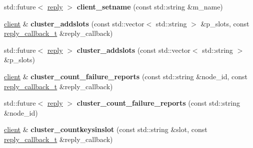 \begin{DoxyCompactItemize}
\item 
\mbox{\label{classcpp__redis_1_1client_aa1ab41fda6b2536f652720b7720a0b63}} 
std\+::future$<$ \mbox{\hyperlink{classcpp__redis_1_1reply}{reply}} $>$ {\bfseries client\+\_\+setname} (const std\+::string \&m_name)
\item 
\mbox{\label{classcpp__redis_1_1client_ac156d5593e1800742188f0eee9016a84}} 
\mbox{\hyperlink{classcpp__redis_1_1client}{client}} \& {\bfseries cluster\+\_\+addslots} (const std\+::vector$<$ std\+::string $>$ \&p\+\_\+slots, const \mbox{\hyperlink{classcpp__redis_1_1client_af7a65eb21aa25230bfbb0b0203c4fc04}{reply\+\_\+callback\+\_\+t}} \&reply\+\_\+callback)
\item 
\mbox{\label{classcpp__redis_1_1client_a0e14578c1addf1de66745a8a95e66aeb}} 
std\+::future$<$ \mbox{\hyperlink{classcpp__redis_1_1reply}{reply}} $>$ {\bfseries cluster\+\_\+addslots} (const std\+::vector$<$ std\+::string $>$ \&p\+\_\+slots)
\item 
\mbox{\label{classcpp__redis_1_1client_a757c2a5c8e5b42ccd3930d89d739f602}} 
\mbox{\hyperlink{classcpp__redis_1_1client}{client}} \& {\bfseries cluster\+\_\+count\+\_\+failure\+\_\+reports} (const std\+::string \&node\+\_\+id, const \mbox{\hyperlink{classcpp__redis_1_1client_af7a65eb21aa25230bfbb0b0203c4fc04}{reply\+\_\+callback\+\_\+t}} \&reply\+\_\+callback)
\item 
\mbox{\label{classcpp__redis_1_1client_af1ff307eb9feb58b48b11bda78131a20}} 
std\+::future$<$ \mbox{\hyperlink{classcpp__redis_1_1reply}{reply}} $>$ {\bfseries cluster\+\_\+count\+\_\+failure\+\_\+reports} (const std\+::string \&node\+\_\+id)
\item 
\mbox{\label{classcpp__redis_1_1client_a78017860625d016074d0495c24c3f9e8}} 
\mbox{\hyperlink{classcpp__redis_1_1client}{client}} \& {\bfseries cluster\+\_\+countkeysinslot} (const std\+::string \&slot, const \mbox{\hyperlink{classcpp__redis_1_1client_af7a65eb21aa25230bfbb0b0203c4fc04}{reply\+\_\+callback\+\_\+t}} \&reply\+\_\+callback)
\item 
\mbox{\label{classcpp__redis_1_1client_a8135eee3cfc95b061aee9b6f7271efce}} 

\end{DoxyCompactItemize}
